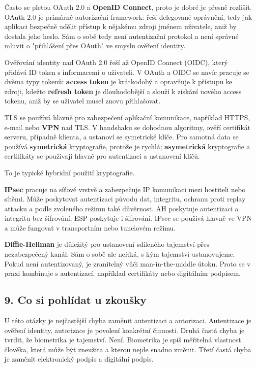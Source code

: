 \documentclass[11pt,a4paper]{article}
\begin{document}
Často se pletou OAuth 2.0 a \textbf{OpenID Connect}, proto je dobré je přesně rozlišit. OAuth 2.0 je primárně autorizační framework: řeší delegované oprávnění, tedy jak aplikaci bezpečně udělit přístup k nějakému zdroji jménem uživatele, aniž by dostala jeho heslo. Sám o sobě tedy není autentizační protokol a není správné mluvit o "přihlášení přes OAuth" ve smyslu ověření identity.

Ověřování identity nad OAuth 2.0 řeší až OpenID Connect (OIDC), který přidává ID token s informacemi o uživateli. V OAuth a OIDC se navíc pracuje se dvěma typy tokenů: \textbf{access token} je krátkodobý a opravňuje k přístupu ke zdroji, kdežto \textbf{refresh token} je dlouhodobější a slouží k získání nového access tokenu, aniž by se uživatel musel znovu přihlašovat.

TLS se používá hlavně pro zabezpečení aplikační komunikace, například HTTPS, e-mail nebo \textbf{VPN} nad TLS. V handshaku se dohodnou algoritmy, ověří certifikát serveru, případně klienta, a ustanoví se symetrické klíče. Pro samotná data se používá \textbf{symetrická} kryptografie, protože je rychlá; \textbf{asymetrická} kryptografie a certifikáty se používají hlavně pro autentizaci a ustanovení klíčů.

To je typické hybridní použití kryptografie.

\textbf{IPsec} pracuje na síťové vrstvě a zabezpečuje IP komunikaci mezi hostiteli nebo sítěmi. Může poskytovat autentizaci původu dat, integritu, ochranu proti replay attacku a podle zvoleného režimu také důvěrnost. AH poskytuje autentizaci a integritu bez šifrování, ESP poskytuje i šifrování. IPsec se používá hlavně ve VPN a může fungovat v transportním nebo tunelovém režimu.

\textbf{Diffie-Hellman} je důležitý pro ustanovení sdíleného tajemství přes nezabezpečený kanál. Sám o sobě ale neříká, s kým tajemství ustanovujeme. Pokud není autentizovaný, je zranitelný vůči man-in-the-middle útoku. Proto se v praxi kombinuje s autentizací, například certifikáty nebo digitálním podpisem.

\subsection*{9. Co si pohlídat u zkoušky}

U této otázky je nejčastější chyba zaměnit autentizaci a autorizaci. Autentizace je ověření identity, autorizace je povolení konkrétní činnosti. Druhá častá chyba je tvrdit, že biometrika je tajemství. Není. Biometrika je spíš měřitelná vlastnost člověka, která může být zneužita a kterou nejde snadno změnit. Třetí častá chyba je zaměnit elektronický podpis a digitální podpis.
\end{document}
